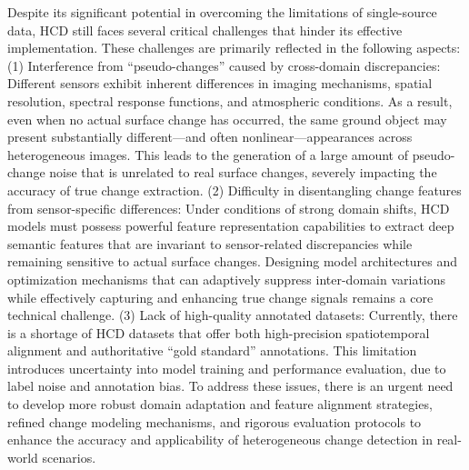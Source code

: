 \documentclass[a4paper,fleqn]{cas-dc}
\begin{document}
Despite its significant potential in overcoming the limitations of single-source data, HCD still faces several critical challenges that hinder its effective implementation. These challenges are primarily reflected in the following aspects: (1) Interference from “pseudo-changes” caused by cross-domain discrepancies: Different sensors exhibit inherent differences in imaging mechanisms, spatial resolution, spectral response functions, and atmospheric conditions. As a result, even when no actual surface change has occurred, the same ground object may present substantially different—and often nonlinear—appearances across heterogeneous images. This leads to the generation of a large amount of pseudo-change noise that is unrelated to real surface changes, severely impacting the accuracy of true change extraction. (2) Difficulty in disentangling change features from sensor-specific differences: Under conditions of strong domain shifts, HCD models must possess powerful feature representation capabilities to extract deep semantic features that are invariant to sensor-related discrepancies while remaining sensitive to actual surface changes. Designing model architectures and optimization mechanisms that can adaptively suppress inter-domain variations while effectively capturing and enhancing true change signals remains a core technical challenge. (3) Lack of high-quality annotated datasets: Currently, there is a shortage of HCD datasets that offer both high-precision spatiotemporal alignment and authoritative “gold standard” annotations. This limitation introduces uncertainty into model training and performance evaluation, due to label noise and annotation bias. To address these issues, there is an urgent need to develop more robust domain adaptation and feature alignment strategies, refined change modeling mechanisms, and rigorous evaluation protocols to enhance the accuracy and applicability of heterogeneous change detection in real-world scenarios.
\end{document}
